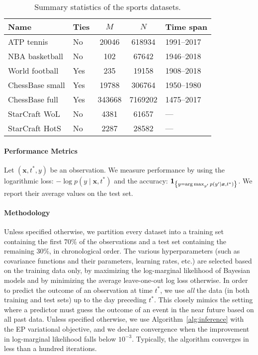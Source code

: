 \begin{table}
	\centering
	\caption{
		Summary statistics of the sports datasets.}
	\label{kks:tab:datasets}
	\begin{tabular}{l lS[table-format=6.0]S[table-format=7.0]l}
		\toprule
		Name            & Ties & $M$    & $N$     & Time span  \\
		\midrule
		ATP tennis      & No   & 20046  & 618934  & 1991--2017 \\
		NBA basketball  & No   & 102    & 67642   & 1946--2018 \\
		World football  & Yes  & 235    & 19158   & 1908--2018 \\
		ChessBase small & Yes  & 19788  & 306764  & 1950--1980 \\
		ChessBase full  & Yes  & 343668 & 7169202 & 1475--2017 \\
		\addlinespace
		StarCraft WoL   & No   & 4381   & 61657   & ---        \\
		StarCraft HotS  & No   & 2287   & 28582   & ---        \\
		\bottomrule
	\end{tabular}
\end{table}

\paragraph{Performance Metrics}
Let $(\bm{x}, t^*, y)$ be an observation.
We measure performance by using
the logarithmic loss: $-\log p(y \mid \bm{x}, t^*)$ and
the accuracy: $\bm{1}_{\left \{ y = \operatorname*{arg\,max}_{y'} p(y' \mid \bm{x}, t^*) \right \} }$.
We report their average values on the test set.

\paragraph{Methodology}
Unless specified otherwise, we partition every dataset into a training set containing the first 70\% of the observations and a test set containing the remaining 30\%, in chronological order.
The various hyperparameters (such as covariance functions and their parameters, learning rates, etc.) are selected based on the training data only, by maximizing the log-marginal likelihood of Bayesian models and by minimizing the average leave-one-out log loss otherwise.
In order to predict the outcome of an observation at time $t^*$, we use \emph{all} the data (in both training and test sets) up to the day preceding $t^*$.
This closely mimics the setting where a predictor must guess the outcome of an event in the near future based on all past data.
Unless specified otherwise, we use Algorithm~\ref{alg:inference} with the EP variational objective, and we declare convergence when the improvement in log-marginal likelihood falls below $10^{-3}$.
Typically, the algorithm converges in less than a hundred iterations.


